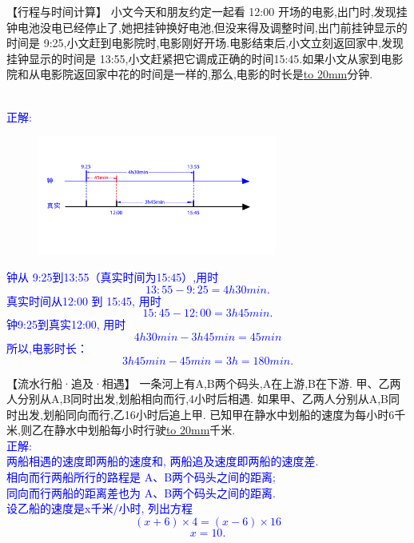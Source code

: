 \item {
    【行程与时间计算】
    小文今天和朋友约定一起看 12:00 开场的电影,出门时,发现挂钟电池没电已经停止了,她把挂钟换好电池,但没来得及调整时间,出门前挂钟显示的时间是 9:25,小文赶到电影院时,电影刚好开场.电影结束后,小文立刻返回家中,发现挂钟显示的时间是 13:55,小文赶紧把它调成正确的时间15:45.如果小文从家到电影院和从电影院返回家中花的时间是一样的,那么,电影的时长是\underline{\hbox to 20mm{}}分钟.
    \ifshowSolution{}
        \fangsong{}\textcolor{blue}{
            \\正解:
            \begin{figure}[H] 
                \centering
                \includegraphics[width=0.7\textwidth]{./pics/Chapter_3/seikai_8.png}
            \end{figure}
            钟从 9:25到13:55（真实时间为15:45）,用时 
            \[ 13:55 - 9:25 = 4h 30 min. \]
            真实时间从12:00 到 15:45, 用时
            \[ 15:45 - 12:00 = 3h 45 min. \]
            钟9:25到真实12:00, 用时
            \[
                4h 30min - 3h 45 min = 45min
            \]
            所以,电影时长：
            \[3h 45min - 45min = 3h = 180min. \]
        }
    \else
        \vspace{2cm}
    \fi
}

\item {
    【流水行船·追及·相遇】
    一条河上有A,B两个码头,A在上游,B在下游. 甲、乙两人分别从A,B同时出发,划船相向而行,4小时后相遇. 如果甲、乙两人分别从A,B同时出发,划船同向而行,乙16小时后追上甲. 已知甲在静水中划船的速度为每小时6千米,则乙在静水中划船每小时行驶\underline{\hbox to 20mm{}}千米.
    \ifshowSolution{}
        \fangsong{}\textcolor{blue}{
            \\正解:\\
            两船相遇的速度即两船的速度和, 两船追及速度即两船的速度差.\\
            相向而行两船所行的路程是 A、B两个码头之间的距离; \\
            同向而行两船的距离差也为 A、B两个码头之间的距离. \\
            设乙船的速度是x千米/小时, 列出方程 
            \[(x+6)\times 4=(x-6)\times 16 \]
            \[ x=10. \]
        }
    \else
        \vspace{2cm}
    \fi
}

